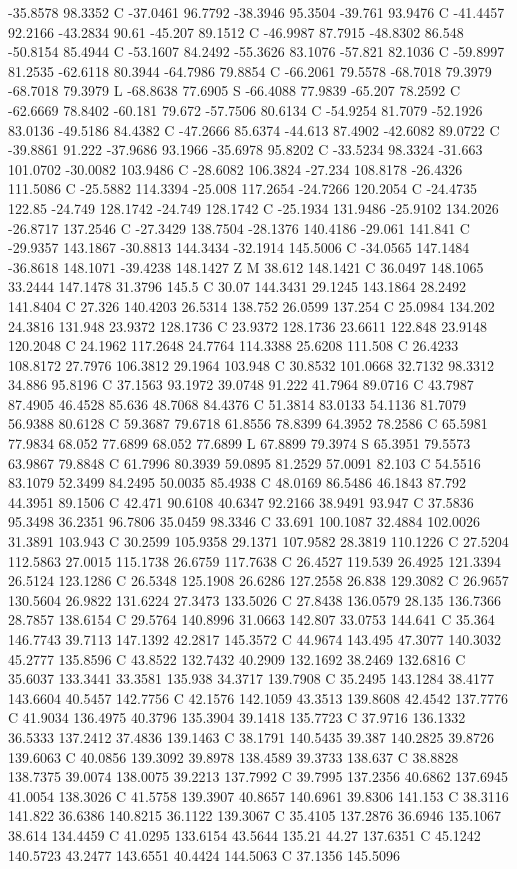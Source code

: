{{{-35.8578 98.3352 C -37.0461 96.7792 -38.3946 95.3504 -39.761 93.9476 C -41.4457 92.2166 -43.2834 90.61 -45.207 89.1512 C -46.9987 87.7915 -48.8302 86.548 -50.8154 85.4944 C -53.1607 84.2492 -55.3626 83.1076 -57.821 82.1036 C -59.8997 81.2535 -62.6118 80.3944 -64.7986 79.8854 C -66.2061 79.5578 -68.7018 79.3979 -68.7018 79.3979 L -68.8638 77.6905 S -66.4088 77.9839 -65.207 78.2592 C -62.6669 78.8402 -60.181 79.672 -57.7506 80.6134 C -54.9254 81.7079 -52.1926 83.0136 -49.5186 84.4382 C -47.2666 85.6374 -44.613 87.4902 -42.6082 89.0722 C -39.8861 91.222 -37.9686 93.1966 -35.6978 95.8202 C -33.5234 98.3324 -31.663 101.0702 -30.0082 103.9486 C -28.6082 106.3824 -27.234 108.8178 -26.4326 111.5086 C -25.5882 114.3394 -25.008 117.2654 -24.7266 120.2054 C -24.4735 122.85 -24.749 128.1742 -24.749 128.1742 C -25.1934 131.9486 -25.9102 134.2026 -26.8717 137.2546 C -27.3429 138.7504 -28.1376 140.4186 -29.061 141.841 C -29.9357 143.1867 -30.8813 144.3434 -32.1914 145.5006 C -34.0565 147.1484 -36.8618 148.1071 -39.4238 148.1427 Z M 38.612 148.1421 C 36.0497 148.1065 33.2444 147.1478 31.3796 145.5 C 30.07 144.3431 29.1245 143.1864 28.2492 141.8404 C 27.326 140.4203 26.5314 138.752 26.0599 137.254 C 25.0984 134.202 24.3816 131.948 23.9372 128.1736 C 23.9372 128.1736 23.6611 122.848 23.9148 120.2048 C 24.1962 117.2648 24.7764 114.3388 25.6208 111.508 C 26.4233 108.8172 27.7976 106.3812 29.1964 103.948 C 30.8532 101.0668 32.7132 98.3312 34.886 95.8196 C 37.1563 93.1972 39.0748 91.222 41.7964 89.0716 C 43.7987 87.4905 46.4528 85.636 48.7068 84.4376 C 51.3814 83.0133 54.1136 81.7079 56.9388 80.6128 C 59.3687 79.6718 61.8556 78.8399 64.3952 78.2586 C 65.5981 77.9834 68.052 77.6899 68.052 77.6899 L 67.8899 79.3974 S 65.3951 79.5573 63.9867 79.8848 C 61.7996 80.3939 59.0895 81.2529 57.0091 82.103 C 54.5516 83.1079 52.3499 84.2495 50.0035 85.4938 C 48.0169 86.5486 46.1843 87.792 44.3951 89.1506 C 42.471 90.6108 40.6347 92.2166 38.9491 93.947 C 37.5836 95.3498 36.2351 96.7806 35.0459 98.3346 C 33.691 100.1087 32.4884 102.0026 31.3891 103.943 C 30.2599 105.9358 29.1371 107.9582 28.3819 110.1226 C 27.5204 112.5863 27.0015 115.1738 26.6759 117.7638 C 26.4527 119.539 26.4925 121.3394 26.5124 123.1286 C 26.5348 125.1908 26.6286 127.2558 26.838 129.3082 C 26.9657 130.5604 26.9822 131.6224 27.3473 133.5026 C 27.8438 136.0579 28.135 136.7366 28.7857 138.6154 C 29.5764 140.8996 31.0663 142.807 33.0753 144.641 C 35.364 146.7743 39.7113 147.1392 42.2817 145.3572 C 44.9674 143.495 47.3077 140.3032 45.2777 135.8596 C 43.8522 132.7432 40.2909 132.1692 38.2469 132.6816 C 35.6037 133.3441 33.3581 135.938 34.3717 139.7908 C 35.2495 143.1284 38.4177 143.6604 40.5457 142.7756 C 42.1576 142.1059 43.3513 139.8608 42.4542 137.7776 C 41.9034 136.4975 40.3796 135.3904 39.1418 135.7723 C 37.9716 136.1332 36.5333 137.2412 37.4836 139.1463 C 38.1791 140.5435 39.387 140.2825 39.8726 139.6063 C 40.0856 139.3092 39.8978 138.4589 39.3733 138.637 C 38.8828 138.7375 39.0074 138.0075 39.2213 137.7992 C 39.7995 137.2356 40.6862 137.6945 41.0054 138.3026 C 41.5758 139.3907 40.8657 140.6961 39.8306 141.153 C 38.3116 141.822 36.6386 140.8215 36.1122 139.3067 C 35.4105 137.2876 36.6946 135.1067 38.614 134.4459 C 41.0295 133.6154 43.5644 135.21 44.27 137.6351 C 45.1242 140.5723 43.2477 143.6551 40.4424 144.5063 C 37.1356 145.5096 }}}
